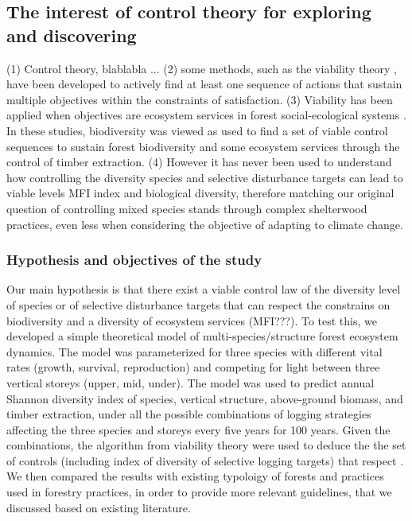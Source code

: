 \documentclass{article}
\begin{document}
\subsection{The interest of control theory for exploring and discovering }

(1) Control theory, blablabla ... \citep{REF}
(2) some methods, such as the viability theory \citep{Aubin1990, Aubin2011}, have been developed to actively find at least one sequence of actions that sustain multiple objectives within the constraints of satisfaction. 
(3) Viability has been applied when objectives are ecosystem services in forest social-ecological systems \citep{mathiasUsingViabilityTheory2015, Houballah2021, Houballah2023}. In these studies, biodiversity was viewed as  used to find a set of viable control sequences to sustain forest biodiversity and some ecosystem services through the control of timber extraction. 
(4) However it has never been used to understand how controlling the diversity species and selective disturbance targets can lead to viable levels MFI index and biological diversity, therefore matching our original question of controlling mixed species stands through complex shelterwood practices, even less when considering the objective of adapting to climate change.

\subsubsection{Hypothesis and objectives of the study}

Our main hypothesis is that there exist a viable control law of the diversity level of species or of selective disturbance targets that can respect the constrains on biodiversity and a diversity of ecosystem services (MFI???). To test this, we developed a simple theoretical model of multi-species/structure forest ecosystem dynamics. The model was parameterized for three species with different vital rates (growth, survival, reproduction) and competing for light between three vertical storeys (upper, mid, under). The model was used to predict annual Shannon diversity index of species, vertical structure, above-ground biomass, and timber extraction, under all the possible combinations of logging strategies affecting the three species and storeys every five years for 100 years.  Given the combinations, the algorithm from viability theory were used to deduce the the set of controls (including index of diversity of selective logging targets) that respect . We then compared the results with existing typoloigy of forests and practices used in forestry practices, in order to provide more relevant guidelines, that we discussed based on existing literature. 

\printbibliography
\end{document}
